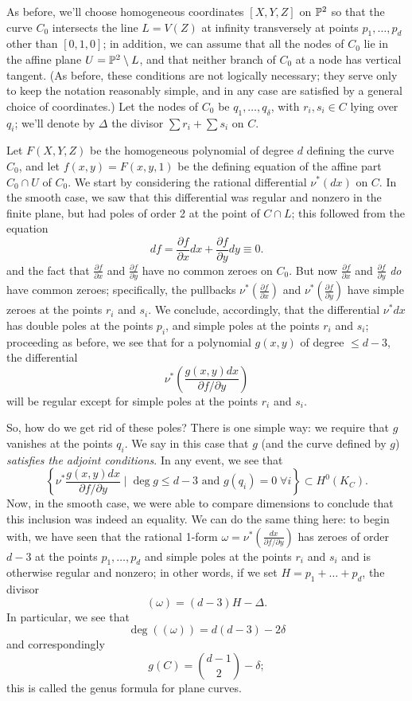 As before, we'll choose homogeneous coordinates  $[X,Y,Z]$ on ${\mathbb P}^2$ so that the curve $C_0$ intersects the line $L = V(Z)$ at infinity transversely at points $p_1,\dots,p_d$ other than $[0,1,0]$; in addition, we can assume that all the nodes of $C_0$ lie in the affine plane $U = {\mathbb P}^2 \setminus L$, and that neither branch of $C_0$ at a node has vertical tangent. (As before, these conditions are not logically necessary; they serve only to keep the notation reasonably simple, and in any case are satisfied by a general choice of coordinates.) Let the nodes of $C_0$ be $q_1,\dots,q_\delta$, with $r_i, s_i \in C$ lying over $q_i$; we'll denote by $\Delta$ the divisor $\sum r_i + \sum s_i$ on $C$.

Let $F(X,Y,Z)$ be the homogeneous polynomial of degree $d$ defining the curve $C_0$, and let $f(x,y) = F(x,y,1)$ be the defining equation of the affine part $C_0 \cap U$ of $C_0$. We start by considering the rational differential $\nu^*(dx)$ on $C$. In the smooth case, we saw that this differential was regular and nonzero in the finite plane, but had poles of order 2 at the point of $C \cap L$; this followed from the equation
$$
 df = \frac{\partial f}{\partial x}dx + \frac{\partial f}{\partial y}dy \equiv 0.
 $$
and the fact that $\frac{\partial f}{\partial x}$ and $\frac{\partial f}{\partial y}$ have no common zeroes on $C_0$. But now $\frac{\partial f}{\partial x}$ and $\frac{\partial f}{\partial y}$ \emph{do} have common zeroes; specifically, the pullbacks $\nu^*(\frac{\partial f}{\partial x})$ and $\nu^*(\frac{\partial f}{\partial y})$ have simple zeroes at the points $r_i$ and $s_i$. We conclude, accordingly, that the differential $\nu^*dx$ has double poles at the points $p_i$, and simple poles at the points $r_i$ and $s_i$; proceeding as before, we see that for a polynomial $g(x,y)$ of degree $\leq d-3$, the differential
$$
\nu^*( \frac{g(x,y)dx}{\partial f/\partial y})
$$
will be regular except for simple poles at the points $r_i$ and $s_i$.

So, how do we get rid of these poles? There is one simple way: we require that $g$ vanishes at the points $q_i$. We say in this case that $g$ (and the curve defined by $g$) \emph{satisfies the adjoint conditions}. In any event, we see that
$$
 \left\{ \nu^* \frac{g(x,y)dx}{\partial f/\partial y} \mid \deg g \leq d-3 \text{ and } g(q_i) = 0 \; \forall i \right\} \subset H^0(K_C).
$$
Now, in the smooth case, we were able to compare dimensions to conclude that this inclusion was indeed an equality. We can do the same thing here: to begin with, we have seen that the  rational 1-form $\omega = \nu^*(\frac{dx}{\partial f/\partial y})$ has zeroes of order $d-3$ at the points $p_1,\dots,p_d$ and simple poles at the points $r_i$ and $s_i$ and is otherwise regular and nonzero; in other words, if we set $H = p_1+\dots + p_d$, the divisor
$$
(\omega) = (d-3)H - \Delta.
$$
In particular, we see that
$$
\deg((\omega)) = d(d-3) - 2\delta
$$
and correspondingly
$$
g(C) = \binom{d-1}{2} - \delta;
$$
this is called the genus formula for plane curves.

